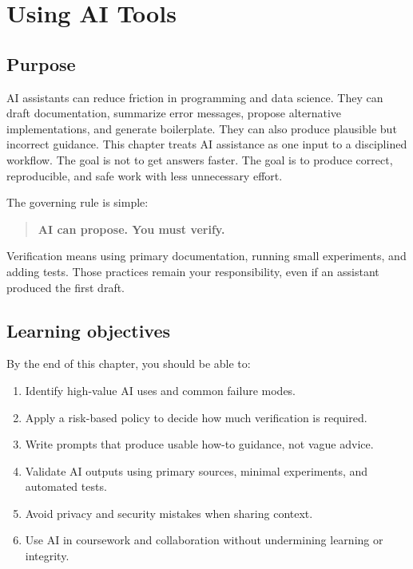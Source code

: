 
\chapter{Using AI Tools}
\label{ch:ai-llm}

\section*{Purpose}
AI assistants can reduce friction in programming and data science. They can draft documentation, summarize error messages, propose alternative implementations, and generate boilerplate. They can also produce plausible but incorrect guidance. This chapter treats AI assistance as one input to a disciplined workflow. The goal is not to get answers faster. The goal is to produce correct, reproducible, and safe work with less unnecessary effort.

The governing rule is simple:

\begin{quote}
\textbf{AI can propose. You must verify.}
\end{quote}

Verification means using primary documentation, running small experiments, and adding tests. Those practices remain your responsibility, even if an assistant produced the first draft.

\section*{Learning objectives}
By the end of this chapter, you should be able to:
\begin{enumerate}[noitemsep]
  \item Identify high-value AI uses and common failure modes.
  \item Apply a risk-based policy to decide how much verification is required.
  \item Write prompts that produce usable how-to guidance, not vague advice.
  \item Validate AI outputs using primary sources, minimal experiments, and automated tests.
  \item Avoid privacy and security mistakes when sharing context.
  \item Use AI in coursework and collaboration without undermining learning or integrity.
\end{enumerate}

